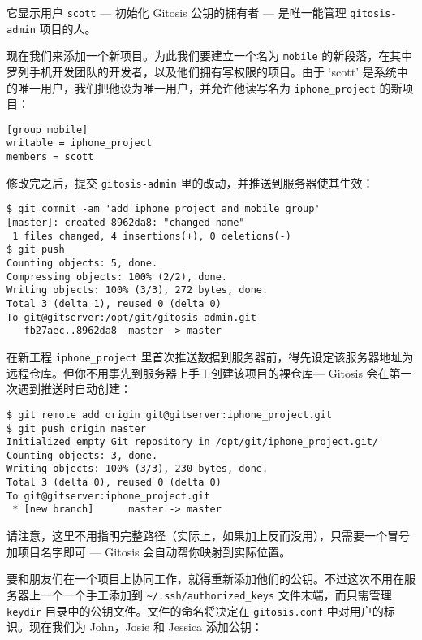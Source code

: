 \documentclass[a4paper]{book}
\newcounter{tab}[chapter]
\begin{document}
它显示用户 \texttt{scott} --- 初始化 Gitosis 公钥的拥有者 --- 是唯一能管理 \texttt{gitosis-admin} 项目的人。

现在我们来添加一个新项目。为此我们要建立一个名为 \texttt{mobile} 的新段落，在其中罗列手机开发团队的开发者，以及他们拥有写权限的项目。由于 `scott' 是系统中的唯一用户，我们把他设为唯一用户，并允许他读写名为 \texttt{iphone\_project} 的新项目：

\begin{shaded}\begin{verbatim}
[group mobile]
writable = iphone_project
members = scott
\end{verbatim}\end{shaded}

修改完之后，提交 \texttt{gitosis-admin} 里的改动，并推送到服务器使其生效：

\begin{shaded}\begin{verbatim}
$ git commit -am 'add iphone_project and mobile group'
[master]: created 8962da8: "changed name"
 1 files changed, 4 insertions(+), 0 deletions(-)
$ git push
Counting objects: 5, done.
Compressing objects: 100% (2/2), done.
Writing objects: 100% (3/3), 272 bytes, done.
Total 3 (delta 1), reused 0 (delta 0)
To git@gitserver:/opt/git/gitosis-admin.git
   fb27aec..8962da8  master -> master
\end{verbatim}\end{shaded}

在新工程 \texttt{iphone\_project} 里首次推送数据到服务器前，得先设定该服务器地址为远程仓库。但你不用事先到服务器上手工创建该项目的裸仓库--- Gitosis 会在第一次遇到推送时自动创建：

\begin{shaded}\begin{verbatim}
$ git remote add origin git@gitserver:iphone_project.git
$ git push origin master
Initialized empty Git repository in /opt/git/iphone_project.git/
Counting objects: 3, done.
Writing objects: 100% (3/3), 230 bytes, done.
Total 3 (delta 0), reused 0 (delta 0)
To git@gitserver:iphone_project.git
 * [new branch]      master -> master
\end{verbatim}\end{shaded}

请注意，这里不用指明完整路径（实际上，如果加上反而没用），只需要一个冒号加项目名字即可 --- Gitosis 会自动帮你映射到实际位置。

要和朋友们在一个项目上协同工作，就得重新添加他们的公钥。不过这次不用在服务器上一个一个手工添加到 \texttt{\textasciitilde{}/.ssh/authorized\_keys} 文件末端，而只需管理 \texttt{keydir} 目录中的公钥文件。文件的命名将决定在 \texttt{gitosis.conf} 中对用户的标识。现在我们为 John，Josie 和 Jessica 添加公钥：
\end{document}
